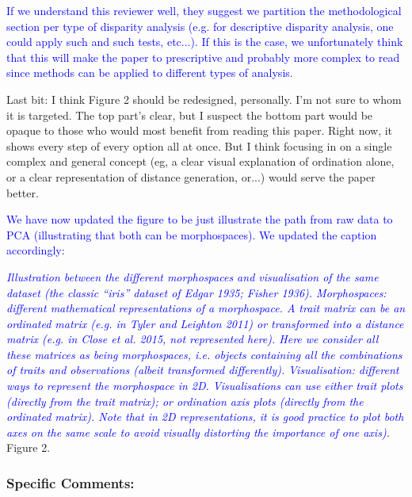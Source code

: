 \documentclass[12pt,letterpaper]{article}
\begin{document}
\textcolor{blue}{If we understand this reviewer well, they suggest we partition the methodological section per type of disparity analysis (e.g. for descriptive disparity analysis, one could apply such and such tests, etc...). If this is the case, we unfortunately think that this will make the paper to prescriptive and probably more complex to read since methods can be applied to different types of analysis.}

\noindent Last bit: I think Figure 2 should be redesigned, personally. I'm not sure to whom it is targeted. The top part's clear, but I suspect the bottom part would be opaque to those who would most benefit from reading this paper. Right now, it shows every step of every option all at once. But I think focusing in on a single complex and general concept (eg, a clear visual explanation of ordination alone, or a clear representation of distance generation, or...) would serve the paper better. 

\textcolor{blue}{We have now updated the figure to be just illustrate the path from raw data to PCA (illustrating that both can be morphospaces). We updated the caption accordingly:}

\textcolor{blue}{\textit{Illustration between the different morphospaces and visualisation of the same dataset (the classic ``iris'' dataset of Edgar 1935; Fisher 1936).
Morphospaces: different mathematical representations of a morphospace. A trait matrix can be an ordinated matrix (e.g. in Tyler and Leighton 2011) or transformed into a distance matrix (e.g. in Close et al. 2015, not represented here).
Here we consider all these matrices as being \textit{morphospaces}, i.e. objects containing all the combinations of traits and observations (albeit transformed differently).
Visualisation: different  ways to represent the morphospace in 2D.
Visualisations can use either trait plots (directly from the trait matrix); or ordination axis plots (directly from the ordinated matrix).
Note that in 2D representations, it is good practice to plot both axes on the same scale to avoid visually distorting the importance of one axis).}} Figure 2. %

\subsubsection{Specific Comments:}
\end{document}
